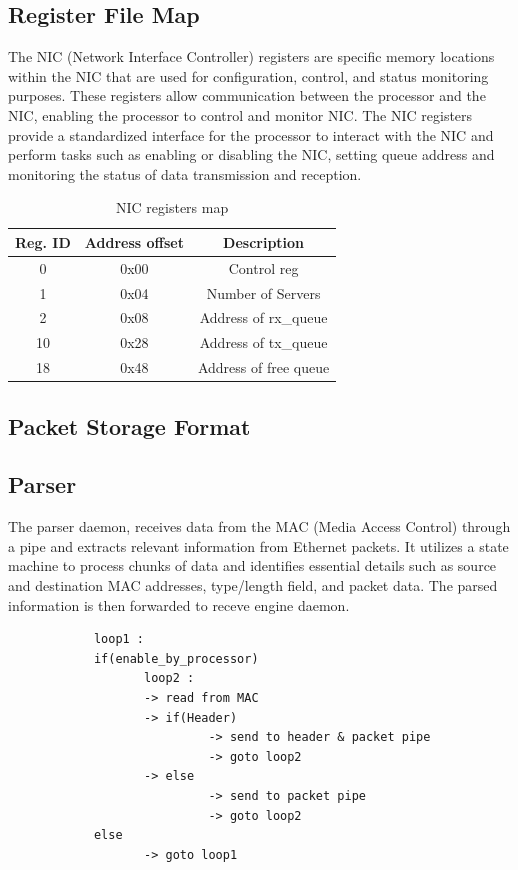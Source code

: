 \documentclass[12pt]{report}
\begin{document}
		\subsection{Register File Map} \label{subsec:NIC_REG}
				The NIC (Network Interface Controller) registers are specific memory locations within the NIC that are used for configuration, control, and status monitoring purposes. These registers allow communication between the processor and the NIC, enabling the processor to control and monitor NIC. The NIC registers provide a standardized interface for the processor to interact with the NIC and perform tasks such as enabling or disabling the NIC, setting queue address and monitoring the status of data transmission and reception.

			\begin{table}[h!]
				\centering
				\begin{tabular}{|c|c|c|}
					\hline
					Reg. ID& Address offset & Description  \\ \hline
					0  & 0x00  & Control reg    \\ \hline
					1  & 0x04  & Number of Servers    \\ \hline
					2  & 0x08  & Address of rx\_queue    \\ \hline
					10  & 0x28  & Address of tx\_queue    \\ \hline
					18  & 0x48  & Address of free queue    \\ \hline
				\end{tabular}
				\caption{NIC registers map}
				\label{tab:NIC_REG}
			\end{table}

		\subsection{Packet Storage Format}

		\subsection{Parser}
				The parser daemon, receives data from the MAC (Media Access Control) through a pipe and extracts relevant information from Ethernet packets. It utilizes a state machine to process chunks of data and identifies essential details such as source and destination MAC addresses, type/length field, and packet data. The parsed information is then forwarded to receve engine daemon.
		\begin{verbatim}
			loop1 :
			if(enable_by_processor)
			       loop2 :
			       -> read from MAC
			       -> if(Header) 
			                -> send to header & packet pipe
			                -> goto loop2
			       -> else
			       	        -> send to packet pipe
			       	        -> goto loop2
			else
			       -> goto loop1
		\end{verbatim}
\end{document}
